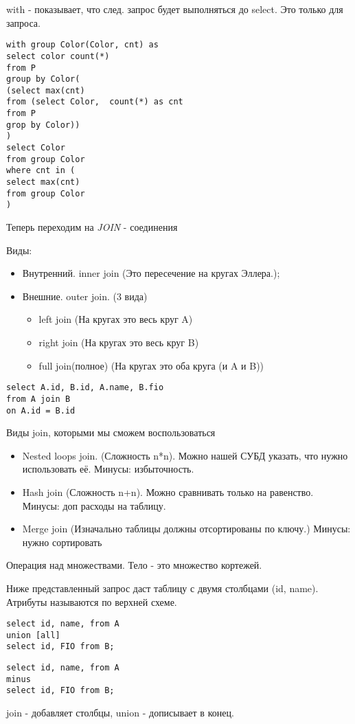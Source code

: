 with - показывает, что след. запрос будет выполняться до select.
Это только для запроса.

\begin{lstlisting}[label=some-code,caption=with. найти цвет с max кол-вом деталей.Обобщенное табличное выражение]
with group Color(Color, cnt) as
select color count(*)
from P
group by Color(
(select max(cnt)
from (select Color,  count(*) as cnt
from P
grop by Color))
)
select Color 
from group Color 
where cnt in (
select max(cnt)
from group Color
)
\end{lstlisting}

Теперь переходим на \textit{JOIN} - соединения

Виды:
\begin{itemize}
	\item Внутренний. inner join (Это пересечение на кругах Эллера.);
	\item Внешние. outer join. (3 вида)
	      \begin{itemize}
		      \item left join (На кругах это весь круг A)
		      \item right join (На кругах это весь круг B)
		      \item full join(полное) (На кругах это оба круга (и A и B))
	      \end{itemize}
\end{itemize}

\begin{lstlisting}[label=some-code,caption=Внутреннее соединение]
select A.id, B.id, A.name, B.fio
from A join B
on A.id = B.id
\end{lstlisting}

Виды join, которыми мы сможем воспользоваться
\begin{itemize}
	\item Nested loops join. (Сложность n*n).
	      Можно нашей СУБД указать, что нужно использовать её.
	      Минусы: избыточность.
	\item Hash join (Сложность n+n). Можно сравнивать только на равенство.
	      Минусы: доп расходы на таблицу.
	\item Merge join (Изначально таблицы должны отсортированы по ключу.)
	      Минусы: нужно сортировать
\end{itemize}

Операция над множествами. Тело - это множество кортежей.

Ниже представленный запрос даст таблицу с двумя столбцами (id, name).
Атрибуты называются по верхней схеме.

\begin{lstlisting}[label=some-code,caption=union]
select id, name, from A
union [all]
select id, FIO from B;
\end{lstlisting}

\begin{lstlisting}[label=some-code,caption=minus]
select id, name, from A
minus
select id, FIO from B;
\end{lstlisting}

join - добавляет столбцы, union - дописывает в конец.